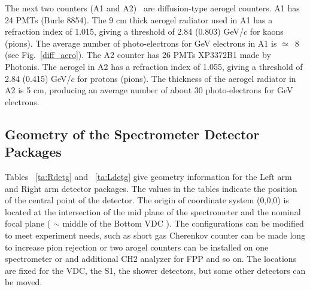 The next two counters (A1 and A2)~\cite{a1a2} are diffusion-type aerogel 
counters. 
A1 has 24 PMTs (Burle 8854). 
The 9 cm thick aerogel radiator used in A1 has a refraction index of 1.015, 
giving a threshold of 2.84 (0.803) GeV/$c$ for kaons (pions). 
The average number of photo-electrons for GeV electrons 
in A1 is $\simeq$~8 (see Fig.~\ref{diff_aero}). The A2 counter has 26 PMTs  
XP3372B1 made by Photonis. 
The aerogel in A2 has a refraction index of 1.055, 
giving a threshold of 2.84 (0.415) GeV/$c$ for protons (pions). 
The thickness of the aerogel radiator in A2 is 5 cm, producing an average 
number of about 30 photo-electrons for GeV electrons.

\subsection{Geometry of the Spectrometer Detector Packages}

Tables ~\ref{ta:Rdetg} and ~\ref{ta:Ldetg} give geometry
information for the Left arm and Right arm detector packages. 
The values in the tables
indicate the position of the central point of the detector.
The origin of coordinate system (0,0,0) is located at the intersection of 
the mid plane of the spectrometer and the nominal focal
plane ( $\sim$ middle of the Bottom VDC ).
The configurations can be modified to meet experiment needs, such
as short gas Cherenkov counter can be made long to increase pion
rejection or two arogel counters can be installed on one spectrometer
or and additional CH2 analyzer for FPP and so on. The locations are
fixed for the VDC, the S1, the shower detectors, but some other detectors 
can be moved.


